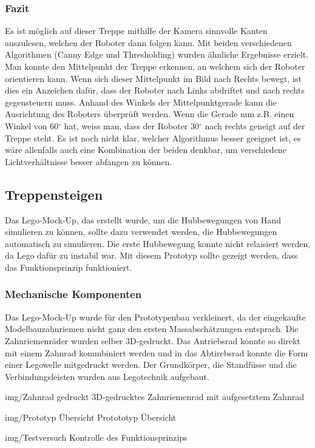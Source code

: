 \subsubsection{Fazit}
Es ist möglich auf dieser Treppe mithilfe der Kamera sinnvolle Kanten auszulesen, welchen der Roboter dann folgen kann. Mit beiden verschiedenen Algorithmen (Canny Edge und Thresholding) wurden ähnliche Ergebnisse erzielt. Man konnte den Mittelpunkt der Treppe erkennen, an welchem sich der Roboter orientieren kann. Wenn sich dieser Mittelpunkt im Bild nach Rechts bewegt, ist dies ein Anzeichen dafür, dass der Roboter nach Links abdriftet und nach rechts gegensteuern muss. Anhand des Winkels der Mittelpunktgerade kann die Ausrichtung des Roboters überprüft werden. Wenn die Gerade nun z.B. einen Winkel von 60$^\circ$
 hat, weiss man, dass der Roboter 30$^\circ$ nach rechts geneigt auf der Treppe steht.
Es ist noch nicht klar, welcher Algorithmus besser geeignet ist, es wäre allenfalls auch eine Kombination der beiden denkbar, um verschiedene Lichtverhältnisse besser abfangen zu können.

\subsection{Treppensteigen}
Das Lego-Mock-Up, das erstellt wurde, um die Hubbewegungen von Hand simulieren zu können, sollte dazu verwendet werden, die Hubbewegungen automatisch zu simulieren. Die erste Hubbewegung konnte nicht relaisiert werden, da Lego dafür zu instabil war. Mit diesem Prototyp sollte gezeigt werden, dass das Funktionsprinzip funktioniert.  

\subsubsection{Mechanische Komponenten}
Das Lego-Mock-Up wurde für den Prototypenbau verkleinert, da der eingekaufte Modelbauzahnriemen nicht ganz den ersten Massabschätzungen entsprach. Die Zahnriemenräder wurden selber 3D-gedruckt. Das Antriebsrad konnte so direkt mit einem Zahnrad kommbiniert werden und in das Abtirebsrad konnte die Form einer Legowelle mitgedruckt werden. Der Grundkörper, die Standfüsse und die Verbindungsleisten wurden aus Legotechnik aufgebaut.

\image
{img/Zahnrad gedruckt}
{3D-gedrucktes Zahnriemenrad mit aufgesetztem Zahnrad}

\image
{img/Prototyp Übersicht}
{Protototyp Übersicht}


\image
{img/Testversuch}
{Kontrolle des Funktionsprinzips}



